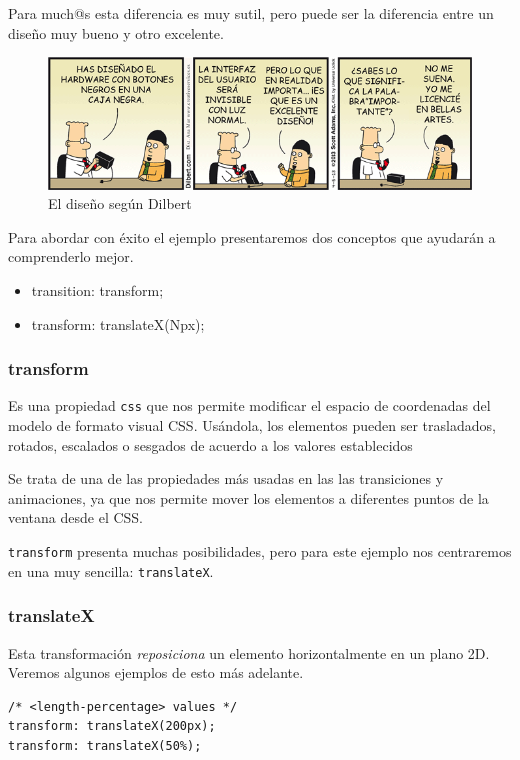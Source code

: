 \documentclass[11pt]{article}
\begin{document}
Para much@s esta diferencia es muy sutil, pero puede ser la diferencia entre un
diseño muy bueno y otro excelente.

\begin{figure}[htb]
\centering
\includegraphics[width=.9\linewidth]{./imgs/dilbert_disenyo.png}
\caption{\label{fig:-Dilbert_001}El diseño según Dilbert}
\end{figure}


Para abordar con éxito el ejemplo presentaremos dos conceptos que ayudarán a
comprenderlo mejor.

\begin{itemize}
\item transition: transform;
\item transform: translateX(Npx);
\end{itemize}

\subsubsection{transform}
\label{sec-1-2-4}

Es una propiedad \verb~css~ que nos permite modificar el espacio de coordenadas
del modelo de formato visual CSS. Usándola, los elementos pueden ser
trasladados, rotados, escalados o sesgados de acuerdo a los valores
establecidos

Se trata de una de las propiedades más usadas en las las transiciones y
animaciones, ya que nos permite mover los elementos a diferentes puntos de
la ventana desde el CSS.

\verb~transform~ presenta muchas posibilidades, pero para este ejemplo nos
centraremos en una muy sencilla: \verb~translateX~.

\subsubsection{translateX}
\label{sec-1-2-5}

Esta transformación \emph{reposiciona} un elemento horizontalmente en un plano
2D. Veremos algunos ejemplos de esto más adelante.

\begin{verbatim}
/* <length-percentage> values */
transform: translateX(200px);
transform: translateX(50%);
\end{verbatim}
\end{document}
